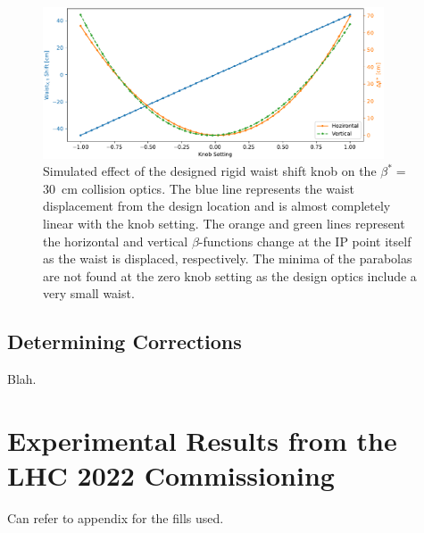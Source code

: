 \begin{figure}
    \centering
    \includegraphics[width=0.9\textwidth]{Figures/IR_Coupling_Correction/rigid_waist_shift_effect_combined.pdf}
    \caption{Simulated effect of the designed rigid waist shift knob on the \(\beta^{\ast} =\) \qty{30}{\centi\metre} collision optics. The \textcolor{mplblue}{blue} line represents the waist displacement from the design location and is almost completely linear with the knob setting. The \textcolor{mplorange}{orange} and \textcolor{mplgreen}{green} lines represent the horizontal and vertical \(\beta\)-functions change at the IP point itself as the waist is displaced, respectively. The minima of the parabolas are not found at the zero knob setting as the design optics include a very small waist.}
    \label{figure:rigid_waist_shift_knob_effect1}
\end{figure}

\subsection{Determining Corrections}

Blah.


\section{Experimental Results from the LHC \num{2022} Commissioning}

Can refer to appendix  for the fills used.

